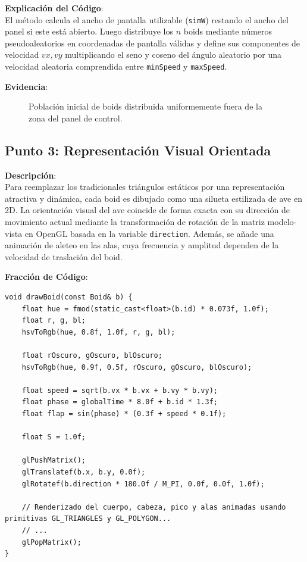 \documentclass[11pt,a4paper]{article}
\begin{document}
\textbf{Explicación del Código}: \\
El método calcula el ancho de pantalla utilizable (\lstinline{simW}) restando el ancho del panel si este está abierto. Luego distribuye los $n$ boids mediante números pseudoaleatorios en coordenadas de pantalla válidas y define sus componentes de velocidad $vx, vy$ multiplicando el seno y coseno del ángulo aleatorio por una velocidad aleatoria comprendida entre \lstinline{minSpeed} y \lstinline{maxSpeed}.

\textbf{Evidencia}:
\begin{figure}[htbp]
    \centering
    \caption{Población inicial de boids distribuida uniformemente fuera de la zona del panel de control.}
    \label{fig:evidencia_punto2}
\end{figure}

\newpage

\subsection{Punto 3: Representación Visual Orientada}
\textbf{Descripción}: \\
Para reemplazar los tradicionales triángulos estáticos por una representación atractiva y dinámica, cada boid es dibujado como una silueta estilizada de ave en 2D. La orientación visual del ave coincide de forma exacta con su dirección de movimiento actual mediante la transformación de rotación de la matriz modelo-vista en OpenGL basada en la variable \lstinline{direction}. Además, se añade una animación de aleteo en las alas, cuya frecuencia y amplitud dependen de la velocidad de traslación del boid.

\textbf{Fracción de Código}:
\begin{lstlisting}[caption={Renderizado y orientación del boid en render.cpp}, label={lst:draw_boid}]
void drawBoid(const Boid& b) {
    float hue = fmod(static_cast<float>(b.id) * 0.073f, 1.0f);
    float r, g, bl;
    hsvToRgb(hue, 0.8f, 1.0f, r, g, bl);

    float rOscuro, gOscuro, blOscuro;
    hsvToRgb(hue, 0.9f, 0.5f, rOscuro, gOscuro, blOscuro);

    float speed = sqrt(b.vx * b.vx + b.vy * b.vy);
    float phase = globalTime * 8.0f + b.id * 1.3f;
    float flap = sin(phase) * (0.3f + speed * 0.1f);

    float S = 1.0f;

    glPushMatrix();
    glTranslatef(b.x, b.y, 0.0f);
    glRotatef(b.direction * 180.0f / M_PI, 0.0f, 0.0f, 1.0f);

    // Renderizado del cuerpo, cabeza, pico y alas animadas usando primitivas GL_TRIANGLES y GL_POLYGON...
    // ...
    glPopMatrix();
}
\end{lstlisting}
\end{document}

